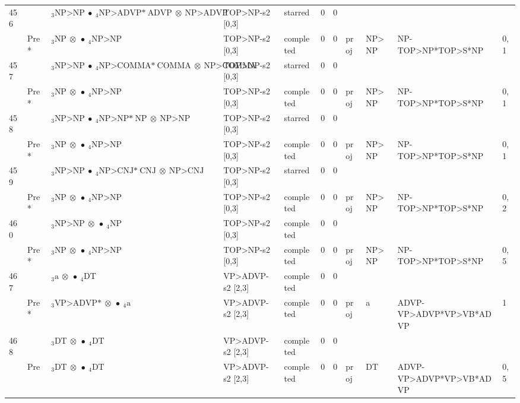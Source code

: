 \documentclass[10pt]{article}
\begin{document}
\begin{longtable}[htbp]{lllllllllll}
456 & & $ {}_3 \textrm{NP>NP} \  \bullet \ {}_{4} \textrm{NP>ADVP*} \ \textrm{ADVP} \  \otimes \ \textrm{NP>ADVP} $ & TOP>NP-s2 [0,3] & starred & 0 & 0 & & & & \\ 
 & Pre *& $ {}_3 \textrm{NP} \  \otimes \  \bullet \ {}_{4} \textrm{NP>NP} $ & TOP>NP-s2 [0,3] & completed & 0 & 0 & proj & NP>NP & NP-TOP>NP*TOP>S*NP & 0,1 \\ 
457 & & $ {}_3 \textrm{NP>NP} \  \bullet \ {}_{4} \textrm{NP>COMMA*} \ \textrm{COMMA} \  \otimes \ \textrm{NP>COMMA} $ & TOP>NP-s2 [0,3] & starred & 0 & 0 & & & & \\ 
 & Pre *& $ {}_3 \textrm{NP} \  \otimes \  \bullet \ {}_{4} \textrm{NP>NP} $ & TOP>NP-s2 [0,3] & completed & 0 & 0 & proj & NP>NP & NP-TOP>NP*TOP>S*NP & 0,1 \\ 
458 & & $ {}_3 \textrm{NP>NP} \  \bullet \ {}_{4} \textrm{NP>NP*} \ \textrm{NP} \  \otimes \ \textrm{NP>NP} $ & TOP>NP-s2 [0,3] & starred & 0 & 0 & & & & \\ 
 & Pre *& $ {}_3 \textrm{NP} \  \otimes \  \bullet \ {}_{4} \textrm{NP>NP} $ & TOP>NP-s2 [0,3] & completed & 0 & 0 & proj & NP>NP & NP-TOP>NP*TOP>S*NP & 0,1 \\ 
459 & & $ {}_3 \textrm{NP>NP} \  \bullet \ {}_{4} \textrm{NP>CNJ*} \ \textrm{CNJ} \  \otimes \ \textrm{NP>CNJ} $ & TOP>NP-s2 [0,3] & starred & 0 & 0 & & & & \\ 
 & Pre *& $ {}_3 \textrm{NP} \  \otimes \  \bullet \ {}_{4} \textrm{NP>NP} $ & TOP>NP-s2 [0,3] & completed & 0 & 0 & proj & NP>NP & NP-TOP>NP*TOP>S*NP & 0,2 \\ 
460 & & $ {}_3 \textrm{NP>NP} \  \otimes \  \bullet \ {}_{4} \textrm{NP} $ & TOP>NP-s2 [0,3] & completed & 0 & 0 & & & & \\ 
 & Pre *& $ {}_3 \textrm{NP} \  \otimes \  \bullet \ {}_{4} \textrm{NP>NP} $ & TOP>NP-s2 [0,3] & completed & 0 & 0 & proj & NP>NP & NP-TOP>NP*TOP>S*NP & 0,5 \\ 
467 & & $ {}_3 \textrm{a} \  \otimes \  \bullet \ {}_{4} \textrm{DT} $ & VP>ADVP-s2 [2,3] & completed & 0 & 0 & & & & \\ 
 & Pre *& $ {}_3 \textrm{VP>ADVP*} \  \otimes \  \bullet \ {}_{4} \textrm{a} $ & VP>ADVP-s2 [2,3] & completed & 0 & 0 & proj & a & ADVP-VP>ADVP*VP>VB*ADVP & 1 \\ 
468 & & $ {}_3 \textrm{DT} \  \otimes \  \bullet \ {}_{4} \textrm{DT} $ & VP>ADVP-s2 [2,3] & completed & 0 & 0 & & & & \\ 
 & Pre & $ {}_3 \textrm{DT} \  \otimes \  \bullet \ {}_{4} \textrm{DT} $ & VP>ADVP-s2 [2,3] & completed & 0 & 0 & proj & DT & ADVP-VP>ADVP*VP>VB*ADVP & 0,5 \\ 

\end{longtable}
\end{document}
